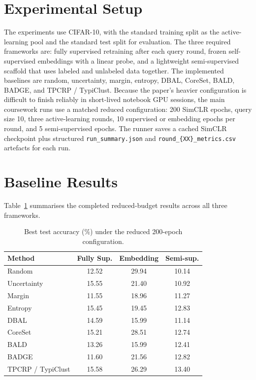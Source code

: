 \documentclass[10pt]{article}
\begin{document}
\section{Experimental Setup}
The experiments use CIFAR-10, with the standard training split as the active-learning pool and the standard test split for evaluation. The three required frameworks are: fully supervised retraining after each query round, frozen self-supervised embeddings with a linear probe, and a lightweight semi-supervised scaffold that uses labeled and unlabeled data together. The implemented baselines are random, uncertainty, margin, entropy, DBAL, CoreSet, BALD, BADGE, and TPCRP / TypiClust. Because the paper's heavier configuration is difficult to finish reliably in short-lived notebook GPU sessions, the main coursework runs use a matched reduced configuration: 200 SimCLR epochs, query size 10, three active-learning rounds, 10 supervised or embedding epochs per round, and 5 semi-supervised epochs. The runner saves a cached SimCLR checkpoint plus structured \texttt{run\_summary.json} and \texttt{round\_\{XX\}\_metrics.csv} artefacts for each run.

\section{Baseline Results}
Table~\ref{tab:baselines} summarises the completed reduced-budget results across all three frameworks.

\begin{table}[h]
\centering
\caption{Best test accuracy (\%) under the reduced 200-epoch configuration.}
\label{tab:baselines}
\small
\begin{tabular}{lccc}
\toprule
Method & Fully Sup. & Embedding & Semi-sup. \\
\midrule
Random & 12.52 & 29.94 & 10.14 \\
Uncertainty & 15.55 & 21.40 & 10.92 \\
Margin & 11.55 & 18.96 & 11.27 \\
Entropy & 15.45 & 19.45 & 12.83 \\
DBAL & 14.59 & 15.99 & 11.14 \\
CoreSet & 15.21 & 28.51 & 12.74 \\
BALD & 13.26 & 15.99 & 12.41 \\
BADGE & 11.60 & 21.56 & 12.82 \\
TPCRP / TypiClust & 15.58 & 26.29 & 13.40 \\
\bottomrule
\end{tabular}
\normalsize
\end{table}
\end{document}

